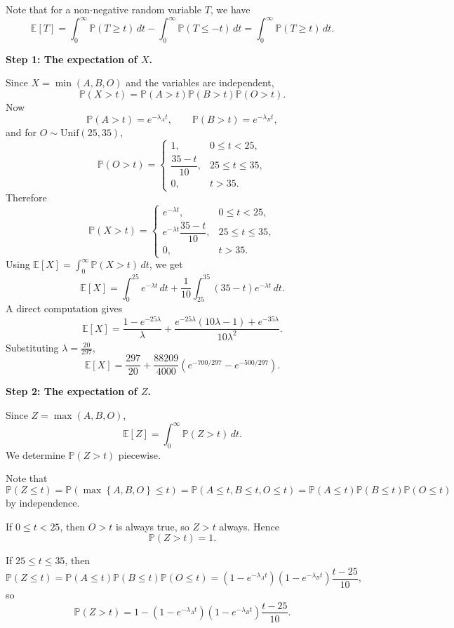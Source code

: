 \documentclass[a4paper,12pt]{article}
\begin{document}
Note that for a non-negative random variable \(T\), we have 
\[
    \mathbb{E} [T] = \int _0^{\infty} \mathbb{P} (T \ge t) \, dt - \int _0^{\infty} \mathbb{P} (T \le -t) \, dt = \int _0^{\infty} \mathbb{P} (T \ge t) \, dt.   
\]

\medskip

\noindent\textbf{Step 1: The expectation of $X$.}

Since $X=\min(A,B,O)$ and the variables are independent,
\[
\mathbb P(X>t)=\mathbb P(A>t)\mathbb P(B>t)\mathbb P(O>t).
\]
Now
\[
\mathbb P(A>t)=e^{-\lambda_A t},\qquad
\mathbb P(B>t)=e^{-\lambda_B t},
\]
and for $O\sim \mathrm{Unif}(25,35)$,
\[
\mathbb P(O>t)=
\begin{cases}
1, & 0\le t<25,\\[2mm]
\dfrac{35-t}{10}, & 25\le t\le 35,\\[2mm]
0, & t>35.
\end{cases}
\]
Therefore
\[
\mathbb P(X>t)=
\begin{cases}
e^{-\lambda t}, & 0\le t<25,\\[2mm]
e^{-\lambda t}\dfrac{35-t}{10}, & 25\le t\le 35,\\[2mm]
0, & t>35.
\end{cases}
\]
Using $\mathbb E[X]=\int_0^\infty \mathbb P(X>t)\,dt$, we get
\[
\mathbb E[X]
=
\int_0^{25} e^{-\lambda t}\,dt
+
\frac1{10}\int_{25}^{35}(35-t)e^{-\lambda t}\,dt.
\]
A direct computation gives
\[
\mathbb E[X]
=
\frac{1-e^{-25\lambda}}{\lambda}
+
\frac{e^{-25\lambda}(10\lambda-1)+e^{-35\lambda}}{10\lambda^2}.
\]
Substituting $\lambda=\frac{20}{297}$,
\[
\mathbb E[X]
=
\frac{297}{20}
+
\frac{88209}{4000}
\left(
e^{-700/297}-e^{-500/297}
\right).
\]

\medskip

\noindent\textbf{Step 2: The expectation of $Z$.}

Since $Z=\max(A,B,O)$,
\[
\mathbb E[Z]=\int_0^\infty \mathbb P(Z>t)\,dt.
\]
We determine $\mathbb P(Z>t)$ piecewise.

Note that 
\[
    \mathbb{P} (Z \le t) = \mathbb{P} (\max \left\{ A, B, O \right\} \le t) = \mathbb{P} (A \le t, B \le t, O \le t) = \mathbb{P} (A \le t) \mathbb{P} (B \le t) \mathbb{P} (O \le t)
\]
by independence.

If $0\le t<25$, then $O>t$ is always true, so $Z>t$ always. Hence
\[
\mathbb P(Z>t)=1.
\]

If $25\le t\le 35$, then
\[
\mathbb P(Z\le t)=\mathbb P(A\le t)\mathbb P(B\le t)\mathbb P(O\le t)
=(1-e^{-\lambda_A t})(1-e^{-\lambda_B t})\frac{t-25}{10},
\]
so
\[
\mathbb P(Z>t)
=
1-(1-e^{-\lambda_A t})(1-e^{-\lambda_B t})\frac{t-25}{10}.
\]
\end{document}
